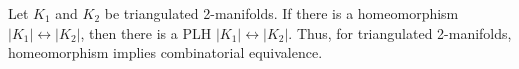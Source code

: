Let $K_1$ and $K_2$ be triangulated 2-manifolds. If there is a homeomorphism $|K_1| \leftrightarrow |K_2|$, then there is a PLH $|K_1| \leftrightarrow |K_2|$. Thus, for triangulated 2-manifolds, homeomorphism implies combinatorial equivalence.

